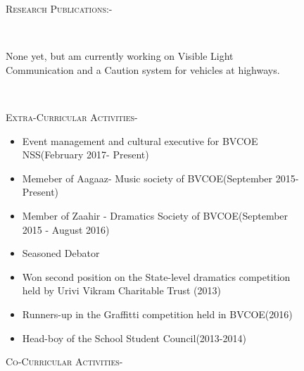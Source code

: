 \documentclass[11pt]{article}
\begin{document}
\begin{figure}[ht]
\begin{minipage}[b]{0.45\linewidth}
\begin{small}
\begin{enumerate}
\end{enumerate}
\end{small}
\end{minipage}
\hspace{0.75cm}
\begin{minipage}[b]{0.45\linewidth}
\noindent\colorbox{WeakOrange}
{\parbox{\dimexpr\textwidth-2\fboxsep\relax}{\textsc{Research Publications:-}}}\\
\begin{small}
None yet, but am currently working on Visible Light Communication and a Caution system for vehicles at highways.
\end{small}\\
\vspace{2mm}
\noindent\colorbox{WeakOrange}
{\parbox{\dimexpr\textwidth-2\fboxsep\relax}{\textsc{Extra-Curricular Activities-}}}
\begin{small}
\begin{itemize}
\item Event management and cultural executive for BVCOE NSS(February 2017- Present)
\item Memeber of Aagaaz- Music society of BVCOE(September 2015- Present)
\item Member of Zaahir - Dramatics Society of BVCOE(September 2015 - August 2016)
\item Seasoned Debator
\item Won second position on the State-level dramatics competition held by Urivi Vikram Charitable Trust (2013)
\item Runners-up in the Graffitti competition held in BVCOE(2016)  
\item Head-boy of the School Student Council(2013-2014) 
\end{itemize}
\end{small}
\noindent\colorbox{WeakOrange}
{\parbox{\dimexpr\textwidth-2\fboxsep\relax}{\textsc{Co-Curricular Activities-}}}


\end{minipage}
\end{figure}
\end{document}
